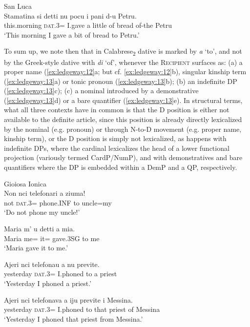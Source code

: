 \documentclass[output=paper,modfonts,nonflat,colorlinks,citecolor=brown]{langsci/langscibook}
\begin{document}
\ex San Luca\\
 \gll Stamatina        si          detti  nu  pocu   i   pani   d-u   Petru.\\
        this.morning   \textsc{dat}.3=  I.gave   a  little   of   bread   of-the   Petru\\
        \glt `This morning I gave a bit of bread to Petru.'
        \z
        \z

To sum up, we note then that in Calabrese\textsubscript{2} dative is marked by \textit{a} ‘to’, and not by the Greek-style dative with \textit{di} ‘of’, whenever the \textsc{Recipient} surfaces as: (a) a proper name (\ref{ex:ledgeway:12}a; but cf. \ref{ex:ledgeway:12}b), singular kinship term (\ref{ex:ledgeway:13}a) or tonic pronoun (\ref{ex:ledgeway:13}b); (b) an indefinite DP (\ref{ex:ledgeway:13}c); (c) a nominal introduced by a demonstrative (\ref{ex:ledgeway:13}d) or a bare quantifier (\ref{ex:ledgeway:13}e). In structural terms, what all three contexts have in common is that the D position is either not available to the definite article, since this position is already directly lexicalized by the nominal (e.g. pronoun) or through N-to-D movement (e.g. proper name, kinship term), or the D position is simply not lexicalized, as happens with indefinite DPs, where the cardinal lexicalizes the head of a lower functional projection (variously termed CardP/NumP), and with demonstratives and bare quantifiers where the DP is embedded within a DemP and a QP, respectively. 

\ea\label{ex:ledgeway:13}
  Gioiosa Ionica\\
\ea
	\gll Non  nci  telefonari  a  ziuma!\\
      not  \textsc{dat}.3=  phone.INF   to  uncle=my\\
      \glt `Do not phone my uncle!'

\ex
	\gll Maria  m’  u  detti  a  mia.\\
    Maria  me=  it=  gave.3SG   to  me\\
    \glt `Maria gave it to me.'

\ex
	\gll Ajeri  nci  telefonau  a  nu   previte.\\
      yesterday  \textsc{dat}.3=  I.phoned  to  a  priest \\
      \glt `Yesterday I phoned a priest.'

\ex
	\gll Ajeri  nci   telefonava  a  iju    previte   i   Messina.\\
      yesterday  \textsc{dat}.3=  I.phoned  to  that   priest   of   Messina\\
      \glt `Yesterday I phoned that priest from Messina.'
\end{document}
